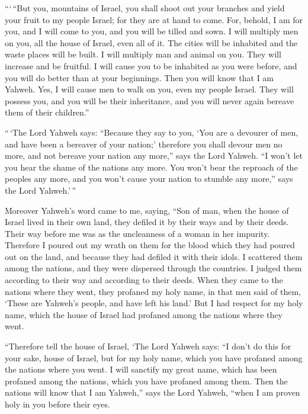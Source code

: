  ```\,``But you, mountains of Israel, you shall shoot out
your branches and yield your fruit to my people Israel; for they are at
hand to come.  For, behold, I am for you, and I will come to
you, and you will be tilled and sown.  I will multiply men
on you, all the house of Israel, even all of it. The cities will be
inhabited and the waste places will be built.  I will
multiply man and animal on you. They will increase and be fruitful. I
will cause you to be inhabited as you were before, and you will do
better than at your beginnings. Then you will know that I am Yahweh.
 Yes, I will cause men to walk on you, even my people
Israel. They will possess you, and you will be their inheritance, and
you will never again bereave them of their children.''

 ``\,`The Lord Yahweh says: ``Because they say to you, `You
are a devourer of men, and have been a bereaver of your nation;'
 therefore you shall devour men no more, and not bereave
your nation any more,'' says the Lord Yahweh.  ``I won't
let you hear the shame of the nations any more. You won't bear the
reproach of the peoples any more, and you won't cause your nation to
stumble any more,'' says the Lord Yahweh.'\,''

 Moreover Yahweh's word came to me, saying, 
``Son of man, when the house of Israel lived in their own land, they
defiled it by their ways and by their deeds. Their way before me was as
the uncleanness of a woman in her impurity.  Therefore I
poured out my wrath on them for the blood which they had poured out on
the land, and because they had defiled it with their idols.
 I scattered them among the nations, and they were
dispersed through the countries. I judged them according to their way
and according to their deeds.  When they came to the
nations where they went, they profaned my holy name, in that men said of
them, `These are Yahweh's people, and have left his land.' 
But I had respect for my holy name, which the house of Israel had
profaned among the nations where they went.

 ``Therefore tell the house of Israel, `The Lord Yahweh
says: ``I don't do this for your sake, house of Israel, but for my holy
name, which you have profaned among the nations where you went.
 I will sanctify my great name, which has been profaned
among the nations, which you have profaned among them. Then the nations
will know that I am Yahweh,'' says the Lord Yahweh, ``when I am proven
holy in you before their eyes.

